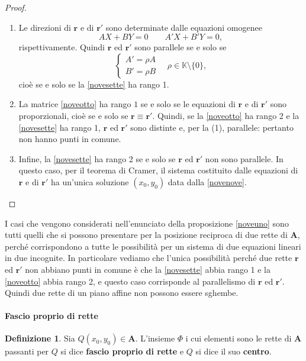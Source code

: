 \documentclass{article}
\theoremstyle{plain}
\theoremstyle{definition}
\newtheorem{defn}{Definizione}[section]
\theoremstyle{remark}
\begin{document}
\begin{proof}\hfill
\begin{enumerate}
    \item Le direzioni di $\mathbf{r}$ e di $\mathbf{r}'$ sono determinate dalle equazioni omogenee
    \[AX + BY = 0\quad\quad A'X + B'Y = 0,\]
    rispettivamente. Quindi $\mathbf{r}$ ed $\mathbf{r}'$ sono parallele se e solo se 
    \[\begin{cases}A' = \rho A\\B' = \rho B\end{cases}\quad \rho\in\mathbb{K}\setminus\{0\},\]
    cioè se e solo se la \ref{novesette} ha rango 1. 

    \item La matrice \ref{noveotto} ha rango $1$ se e solo se le equazioni di $\mathbf{r}$ e di $\mathbf{r}'$ sono proporzionali, cioè se e solo se $\mathbf{r} \equiv \mathbf{r}'$. 
    Quindi, se la \ref{noveotto} ha rango 2 e la \ref{novesette} ha rango 1, $\mathbf{r}$ ed $\mathbf{r}'$ sono distinte e, per la (1), parallele: pertanto non hanno punti in comune. 

    \item Infine, la \ref{novesette} ha rango 2 se e solo se $\mathbf{r}$ ed $\mathbf{r}'$ non sono parallele. 
    In questo caso, per il teorema di Cramer, il sistema costituito dalle equazioni di $\mathbf{r}$ e di $\mathbf{r}'$ ha un'unica soluzione 
    $(x_0, y_0)$ data dalla \ref{novenove}.
\end{enumerate}
\end{proof}

\vspace{10pt}

I casi che vengono considerati nell'enunciato della proposizione \ref{noveuno} sono tutti quelli che si possono presentare per la posizione reciproca di due rette di $\mathbf{A}$, perché corrispondono a tutte le possibilità per un sistema di due equazioni lineari in due incognite. 
In particolare vediamo che l'unica possibilità perché due rette $\mathbf{r}$ ed $\mathbf{r}'$ non abbiano punti in comune è che la \ref{novesette} abbia rango 1 e la \ref{noveotto} abbia rango 2, e questo caso corrisponde al parallelismo di $\mathbf{r}$ ed $\mathbf{r}'$. 
Quindi due rette di un piano affine non possono essere sghembe.

\vspace{10pt}

\paragraph{Fascio proprio di rette}
\begin{bxthm}
\begin{defn}
Sia $Q(x_0, y_0) \in \mathbf{A}$. L'insieme $\Phi$ i cui elementi sono le rette di $\mathbf{A}$ passanti per $Q$ si dice \textbf{fascio proprio di rette} e $Q$ si dice il suo \textbf{centro}.
\end{defn}    
\end{bxthm}
\end{document}
